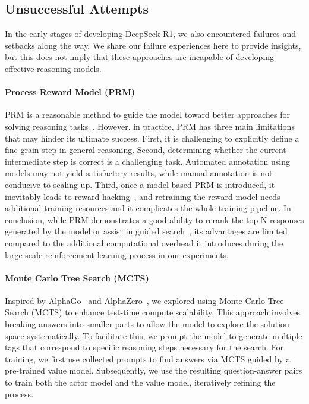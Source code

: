 \documentclass[11pt, a4paper, logo, copyright, nonumbering]{deepseek}
\newcommand{\dsri}{DeepSeek-R1}
\begin{document}
\subsection{Unsuccessful Attempts}
In the early stages of developing \dsri{}, we also encountered failures and setbacks along the way. We share our failure experiences here to provide insights, but this does not imply that these approaches are incapable of developing effective reasoning models.

\paragraph{Process Reward Model (PRM)}
PRM is a reasonable method to guide the model toward better approaches for solving reasoning tasks~\citep{uesato2022solving, lightman2023let,mathshepherd}. However, in practice, PRM has three main limitations that may hinder its ultimate success. First, it is challenging to explicitly define a fine-grain step in general reasoning. 
Second, determining whether the current intermediate step is correct is a challenging task. Automated annotation using models may not yield satisfactory results, while manual annotation is not conducive to scaling up.
Third, once a model-based PRM is introduced, it inevitably leads to reward hacking~\citep{gao2022scalinglawsrewardmodel},  and retraining the reward model needs additional training resources and it complicates the whole training pipeline. In conclusion, while PRM demonstrates a good ability to rerank the top-N responses generated by the model or assist in guided search~\citep{snell2024scalingllmtesttimecompute}, its advantages are limited compared to the additional computational overhead it introduces during the large-scale reinforcement learning process in our experiments.

\paragraph{Monte Carlo Tree Search (MCTS)}
Inspired by AlphaGo~\citep{alphago} and AlphaZero~\citep{alphazero}, we explored using Monte Carlo Tree Search (MCTS) to enhance test-time compute scalability. This approach involves breaking answers into smaller parts to allow the model to explore the solution space systematically. To facilitate this, we prompt the model to generate multiple tags that correspond to specific reasoning steps necessary for the search. For training, we first use collected prompts to find answers via MCTS guided by a pre-trained value model. Subsequently, we use the resulting question-answer pairs to train both the actor model and the value model, iteratively refining the process.
\end{document}
